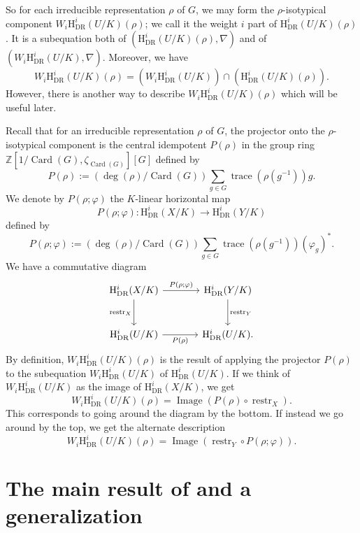 So for each irreducible representation \(\rho\) of \(G\), we may form the \(\rho\)-isotypical component \(W_i\mathrm{H}^i_{\mathrm{DR}}(U/K)(\rho)\); we call it the weight \(i\) part of \(\mathrm{H}^i_{\mathrm{DR}}(U/K)(\rho)\). It is a subequation both of \((\mathrm{H}^i_{\mathrm{DR}}(U/K)(\rho),\nabla)\) and of \((W_i\mathrm{H}^i_{\mathrm{DR}}(U/K),\nabla)\). Moreover, we have
\[
W_i\mathrm{H}^i_{\mathrm{DR}}(U/K)(\rho)=(W_i\mathrm{H}^i_{\mathrm{DR}}(U/K))\cap(\mathrm{H}^i_{\mathrm{DR}}(U/K)(\rho)).
\]
However, there is another way to describe \(W_i\mathrm{H}^i_{\mathrm{DR}}(U/K)(\rho)\) which will be useful later.

Recall that for an irreducible representation \(\rho\) of \(G\), the projector onto the \(\rho\)-isotypical component is the central idempotent \(P(\rho)\) in the group ring \(\mathbb{Z}[1/\operatorname{Card}(G),\zeta_{\operatorname{Card}(G)}][G]\) defined by
\[
P(\rho):=(\deg(\rho)/\operatorname{Card}(G))\sum_{g\in G}\operatorname{trace}(\rho(g^{-1}))g.
\]
We denote by \(P(\rho;\varphi)\) the \(K\)-linear horizontal map
\[
P(\rho;\varphi):\mathrm{H}^i_{\mathrm{DR}}(X/K)\to\mathrm{H}^i_{\mathrm{DR}}(Y/K)
\]
defined by
\[
P(\rho;\varphi):=(\deg(\rho)/\operatorname{Card}(G))\sum_{g\in G}\operatorname{trace}(\rho(g^{-1}))(\varphi_g)^*.
\]
We have a commutative diagram
\[
\begin{tikzcd}[column sep=large,row sep=large]
\mathrm{H}^i_{\mathrm{DR}}(X/K) \arrow[r,"P(\rho;\varphi)"] \arrow[d,"\operatorname{restr}_X"'] &
\mathrm{H}^i_{\mathrm{DR}}(Y/K) \arrow[d,"\operatorname{restr}_Y"]\\
\mathrm{H}^i_{\mathrm{DR}}(U/K) \arrow[r,"P(\rho)"'] &
\mathrm{H}^i_{\mathrm{DR}}(U/K).
\end{tikzcd}
\]
By definition, \(W_i\mathrm{H}^i_{\mathrm{DR}}(U/K)(\rho)\) is the result of applying the projector \(P(\rho)\) to the subequation \(W_i\mathrm{H}^i_{\mathrm{DR}}(U/K)\) of \(\mathrm{H}^i_{\mathrm{DR}}(U/K)\). If we think of \(W_i\mathrm{H}^i_{\mathrm{DR}}(U/K)\) as the image of \(\mathrm{H}^i_{\mathrm{DR}}(X/K)\), we get
\[
W_i\mathrm{H}^i_{\mathrm{DR}}(U/K)(\rho)=\operatorname{Image}(P(\rho)\circ\operatorname{restr}_X).
\]
This corresponds to going around the diagram by the bottom. If instead we go around by the top, we get the alternate description
\[
W_i\mathrm{H}^i_{\mathrm{DR}}(U/K)(\rho)=\operatorname{Image}(\operatorname{restr}_Y\circ P(\rho;\varphi)).
\]

\section[The main result of Ka-ASDE and a generalization]{The main result of \cite{Ka-ASDE} and a generalization}
\label{sec:9.3}


